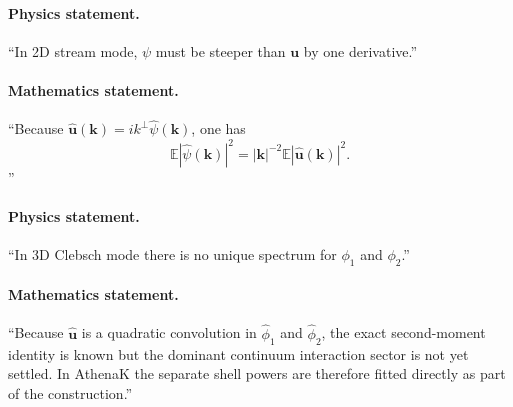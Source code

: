 \documentclass[11pt]{article}
\newcommand{\E}{\mathbb{E}}
\newcommand{\kk}{\mathbf{k}}
\newcommand{\uu}{\mathbf{u}}
\begin{document}
\paragraph{Physics statement.}
``In 2D stream mode, $\psi$ must be steeper than $\uu$ by one derivative.''

\paragraph{Mathematics statement.}
``Because $\hat{\uu}(\kk)=ik^\perp\hat{\psi}(\kk)$, one has
\[
\E |\hat{\psi}(\kk)|^2 = |\kk|^{-2}\E |\hat{\uu}(\kk)|^2.
\]
''

\paragraph{Physics statement.}
``In 3D Clebsch mode there is no unique spectrum for $\phi_1$ and $\phi_2$.''

\paragraph{Mathematics statement.}
``Because $\hat{\uu}$ is a quadratic convolution in $\hat{\phi}_1$ and $\hat{\phi}_2$, the exact second-moment identity is known but the dominant continuum interaction sector is not yet settled. In AthenaK the separate shell powers are therefore fitted directly as part of the construction.''
\end{document}
